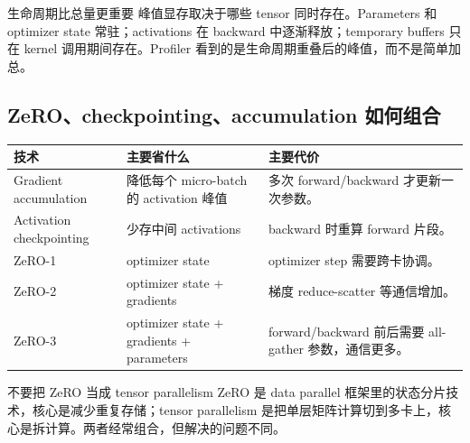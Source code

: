 \begin{knowledgebox}{生命周期比总量更重要}
峰值显存取决于哪些 tensor 同时存在。Parameters 和 optimizer state 常驻；activations 在 backward 中逐渐释放；temporary buffers 只在 kernel 调用期间存在。Profiler 看到的是生命周期重叠后的峰值，而不是简单加总。
\end{knowledgebox}

\subsection{ZeRO、checkpointing、accumulation 如何组合}

\begin{longtable}{p{}p{}p{}}
\toprule
\textbf{技术} & \textbf{主要省什么} & \textbf{主要代价} \\
\midrule
Gradient accumulation & 降低每个 micro-batch 的 activation 峰值 & 多次 forward/backward 才更新一次参数。 \\
Activation checkpointing & 少存中间 activations & backward 时重算 forward 片段。 \\
ZeRO-1 & optimizer state & optimizer step 需要跨卡协调。 \\
ZeRO-2 & optimizer state + gradients & 梯度 reduce-scatter 等通信增加。 \\
ZeRO-3 & optimizer state + gradients + parameters & forward/backward 前后需要 all-gather 参数，通信更多。 \\
\bottomrule
\end{longtable}

\begin{warningbox}{不要把 ZeRO 当成 tensor parallelism}
ZeRO 是 data parallel 框架里的状态分片技术，核心是减少重复存储；tensor parallelism 是把单层矩阵计算切到多卡上，核心是拆计算。两者经常组合，但解决的问题不同。
\end{warningbox}



